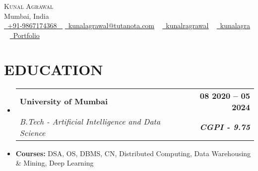 \documentclass[letterpaper,11pt]{article}
\makeatletter
\newcommand{\resumeItem}[1]{
  \item\small{
    {#1 \vspace{-2pt}}
  }
}
\newcommand{\resumeSubheading}[4]{
  \vspace{-2pt}\item
    \begin{tabular*}{1.0\textwidth}[t]{l@{\extracolsep{\fill}}r}
      \textbf{\large#1} & \textbf{\small #2} \\
      \textit{\large#3} & \textit{\small #4} \\
      
    \end{tabular*}\vspace{-7pt}
}
\newcommand{\resumeSubHeadingListStart}{\begin{itemize}[leftmargin=0.0in, label={}]}
\newcommand{\resumeSubHeadingListEnd}{\end{itemize}}
\makeatother
\begin{document}


\begin{center}
    {\Huge \scshape {Kunal Agrawal}} \\ \vspace{1pt}
    Mumbai, India \\ \vspace{1pt}
    \small \href{tel:+919867174368}{ \raisebox{-0.1\height}{\faPhone*}\ \underline{+91-9867174368} ~} \href{mailto:kunalagrawal@tutanota.com}{\raisebox{-0.2\height}{\faEnvelope[regular]}\  \underline{kunalagrawal@tutanota.com}} ~ 
    \href{https://linkedin.com/in/kunalragrawal}{\raisebox{-0.2\height}\faLinkedinIn\ \underline{kunalragrawal}}  ~
    \href{https://github.com/kunalagra}{\raisebox{-0.2\height}\faGithub\ \underline{kunalagra}} ~
    \href{https://kunalagrawal.vercel.app/}{\raisebox{-0.2\height}{\faLink}\ \underline{Portfolio}}
    \vspace{-8pt}
\end{center}


\section{EDUCATION}
  \resumeSubHeadingListStart
    \resumeSubheading
      {University of Mumbai}{08 2020 -- 05 2024}
      {B.Tech - Artificial Intelligence and Data Science}{\textbf{CGPI - 9.75}}
        \resumeItem{\normalsize{\textbf{Courses:} DSA, OS, DBMS, CN, Distributed Computing, Data Warehousing \& Mining, Deep Learning}}
  
      
  \resumeSubHeadingListEnd
  

\end{document}
